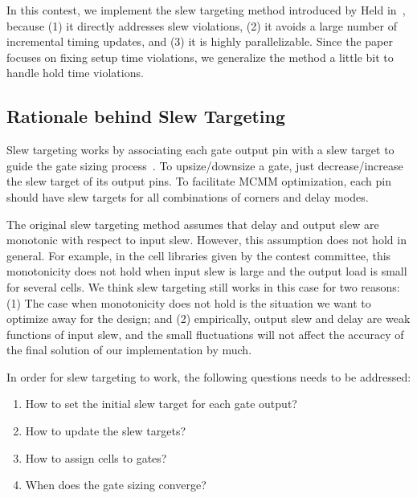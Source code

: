In this contest, we implement the slew targeting method introduced by Held in~\cite{Held:Gate}, because (1) it directly addresses slew violations, (2) it avoids a large number of incremental timing updates, and (3) it is highly parallelizable. Since the paper focuses on fixing setup time violations, we generalize the method a little bit to handle hold time violations.


\subsection{Rationale behind Slew Targeting}

Slew targeting works by associating each gate output pin with a slew target to guide the gate sizing process~\cite{Held:Gate}. To upsize/downsize a gate, just decrease/increase the slew target of its output pins. To facilitate MCMM optimization, each pin should have slew targets for all combinations of corners and delay modes.

The original slew targeting method assumes that delay and output slew are monotonic with respect to input slew. However, this assumption does not hold in general. For example, in the cell libraries given by the contest committee, this monotonicity does not hold when input slew is large and the output load is small for several cells. We think slew targeting still works in this case for two reasons: (1) The case when monotonicity does not hold is the situation we want to optimize away for the design; and (2) empirically, output slew and delay are weak functions of input slew, and the small fluctuations will not affect the accuracy of the final solution of our implementation by much.

In order for slew targeting to work, the following questions needs to be addressed:
\begin{enumerate}
\item How to set the initial slew target for each gate output?
\item How to update the slew targets?
\item How to assign cells to gates?
\item When does the gate sizing converge?
\end{enumerate}

